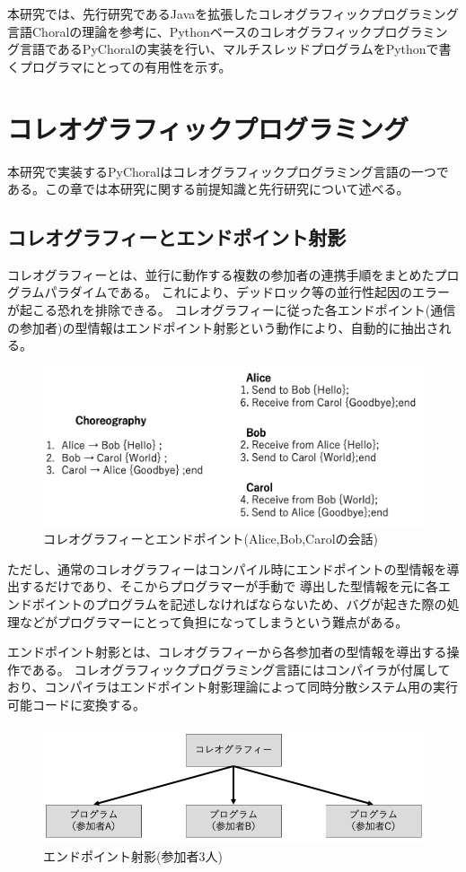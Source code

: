 \documentclass{thesis}
\begin{document}
本研究では、先行研究であるJavaを拡張したコレオグラフィックプログラミング言語Choralの理論を参考に、Pythonベースのコレオグラフィックプログラミング言語であるPyChoralの実装を行い、マルチスレッドプログラムをPythonで書くプログラマにとっての有用性を示す。
\chapter{コレオグラフィックプログラミング}
本研究で実装するPyChoralはコレオグラフィックプログラミング言語の一つである。この章では本研究に関する前提知識と先行研究について述べる。
\section{コレオグラフィーとエンドポイント射影}
コレオグラフィーとは、並行に動作する複数の参加者の連携手順をまとめたプログラムパラダイムである。
これにより、デッドロック等の並行性起因のエラーが起こる恐れを排除できる。
コレオグラフィーに従った各エンドポイント(通信の参加者)の型情報はエンドポイント射影という動作により、自動的に抽出される。
\begin{figure}[H]
  \centering
  \includegraphics[scale=0.5]{image/choreography.png}
  \caption{コレオグラフィーとエンドポイント(Alice,Bob,Carolの会話)}
\end{figure}
ただし、通常のコレオグラフィーはコンパイル時にエンドポイントの型情報を導出するだけであり、そこからプログラマーが手動で
導出した型情報を元に各エンドポイントのプログラムを記述しなければならないため、バグが起きた際の処理などがプログラマーにとって負担になってしまうという難点がある。

エンドポイント射影とは、コレオグラフィーから各参加者の型情報を導出する操作である。
コレオグラフィックプログラミング言語にはコンパイラが付属しており、コンパイラはエンドポイント射影理論によって同時分散システム用の実行可能コードに変換する。

\begin{figure}[H]
  \centering
  \includegraphics[scale=0.8]{image/epp.png}
  \caption{エンドポイント射影(参加者3人)}
\end{figure}
\end{document}
